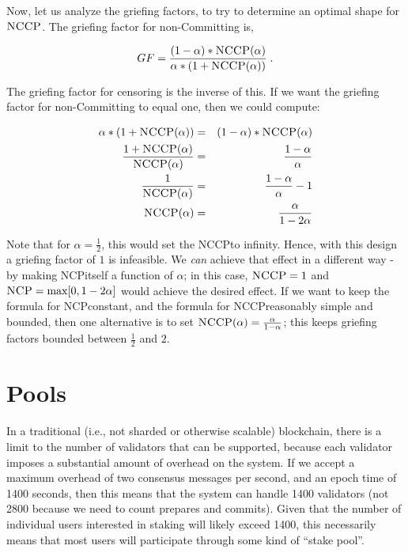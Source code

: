 \documentclass[12pt, final]{article}
\newcommand{\NCP}{\textsc{NCP}\space}
\newcommand{\NCCP}{\textsc{NCCP}\space}
\begin{document}
Now, let us analyze the griefing factors, to try to determine an optimal shape for $\NCCP$. The griefing factor for non-Committing is,

\begin{equation}
GF = \frac{(1-\alpha) * \NCCP(\alpha)}{\alpha * (1 + \NCCP(\alpha))} \; .
\end{equation}

The griefing factor for censoring is the inverse of this. If we want the griefing factor for non-Committing to equal one, then we could compute:

\begin{eqnarray}
\alpha * (1 + \NCCP(\alpha)) &=& (1-\alpha) * \NCCP(\alpha) \\
\frac{1 + \NCCP(\alpha)}{\NCCP(\alpha)} &=& \frac{1-\alpha}{\alpha} \\
\frac{1}{\NCCP(\alpha)} &=& \frac{1-\alpha}{\alpha} - 1 \\
\NCCP(\alpha) &=& \frac{\alpha}{1-2\alpha}
\end{eqnarray}

Note that for $\alpha = \frac{1}{2}$, this would set the \NCCP to infinity. Hence, with this design a griefing factor of $1$ is infeasible. We \emph{can} achieve that effect in a different way - by making \NCP itself a function of $\alpha$; in this case, $\NCCP = 1$ and $\NCP = \max[0, 1 - 2\alpha]$ would achieve the desired effect. If we want to keep the formula for \NCP constant, and the formula for \NCCP reasonably simple and bounded, then one alternative is to set $\NCCP(\alpha) = \frac{\alpha}{1-\alpha}$; this keeps griefing factors bounded between $\frac{1}{2}$ and $2$.

\section{Pools}

In a traditional (i.e., not sharded or otherwise scalable) blockchain, there is a limit to the number of validators that can be supported, because each validator imposes a substantial amount of overhead on the system. If we accept a maximum overhead of two consensus messages per second, and an epoch time of 1400 seconds, then this means that the system can handle 1400 validators (not 2800 because we need to count prepares and commits). Given that the number of individual users interested in staking will likely exceed 1400, this necessarily means that most users will participate through some kind of ``stake pool''.
\end{document}
